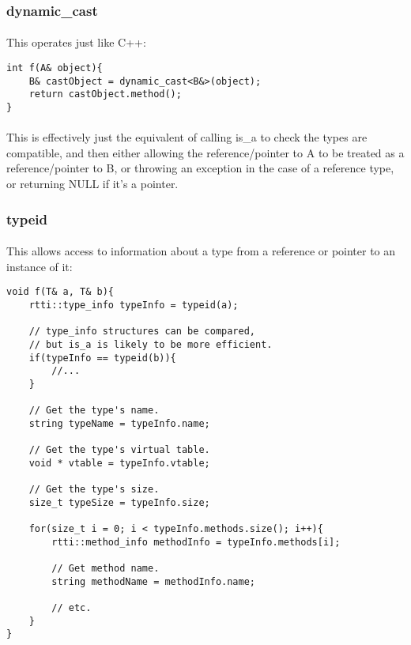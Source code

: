 \documentclass[12pt,twoside,notitlepage]{report}
\begin{document}
\subsubsection{dynamic\_cast}

\paragraph{}
This operates just like C++:

\begin{lstlisting}
int f(A& object){
	B& castObject = dynamic_cast<B&>(object);
	return castObject.method();
}
\end{lstlisting}

\paragraph{}
This is effectively just the equivalent of calling is\_a to check the types are compatible, and then either allowing the reference/pointer to A to be treated as a reference/pointer to B, or throwing an exception in the case of a reference type, or returning NULL if it's a pointer.

\subsubsection{typeid}

\paragraph{}
This allows access to information about a type from a reference or pointer to an instance of it:

\begin{lstlisting}
void f(T& a, T& b){
	rtti::type_info typeInfo = typeid(a);
	
	// type_info structures can be compared,
	// but is_a is likely to be more efficient.
	if(typeInfo == typeid(b)){
		//...
	}
	
	// Get the type's name.
	string typeName = typeInfo.name;
	
	// Get the type's virtual table.
	void * vtable = typeInfo.vtable;
	
	// Get the type's size.
	size_t typeSize = typeInfo.size;
	
	for(size_t i = 0; i < typeInfo.methods.size(); i++){
		rtti::method_info methodInfo = typeInfo.methods[i];
		
		// Get method name.
		string methodName = methodInfo.name;
		
		// etc.
	}
}
\end{lstlisting}
\end{document}
